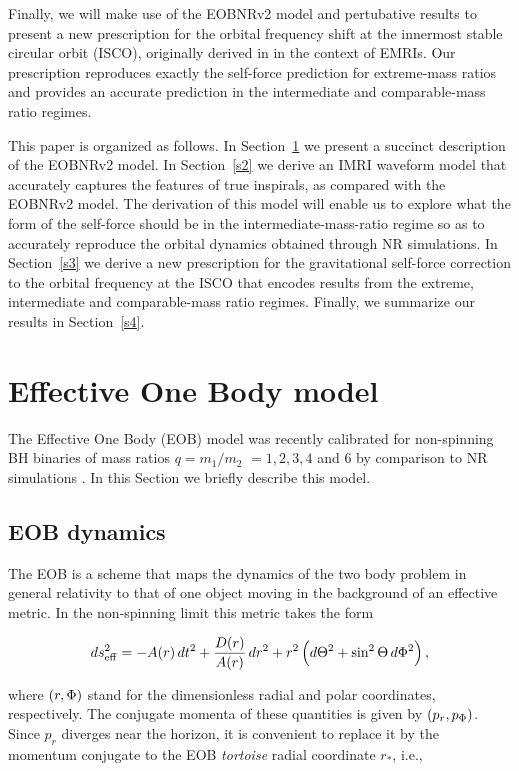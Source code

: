 Finally, we will make use of the EOBNRv2 model and pertubative results to present a new prescription for the orbital frequency shift at the innermost stable circular orbit (ISCO), originally derived in \cite{inner} in the context of EMRIs. Our prescription reproduces exactly the self-force prediction for extreme-mass ratios and provides an accurate prediction in the intermediate and comparable-mass ratio regimes.   

This paper is organized as follows. In Section~\ref{s1} we present a succinct description of the EOBNRv2 model. In Section~\ref{s2} we derive an IMRI waveform model that accurately captures the features of true inspirals, as compared with the EOBNRv2 model. The derivation of this model will enable us to explore what the form of the self-force should be in the intermediate-mass-ratio regime so as to accurately reproduce the orbital dynamics obtained through NR simulations. In Section~\ref{s3} we derive a new prescription for the gravitational self-force correction to the orbital frequency at the ISCO that encodes results from the extreme, intermediate and comparable-mass ratio regimes. Finally, we summarize our results in Section~\ref{s4}.


\section{Effective One Body model}
\label{s1}

The Effective One Body (EOB) model was recently calibrated for non-spinning BH binaries of mass ratios   \(q=m_1/m_2\) \(=1,2,3,4\) and 6 by comparison to NR simulations \cite{BuonannoEOBv2Main}. In this Section we briefly describe this model.

\subsection{EOB dynamics}

The EOB is a scheme that maps the dynamics of the two body problem in general relativity to that of one object moving in the background of an effective metric. In the non-spinning limit this metric takes the form 

\begin{equation}
  ds_\mathrm{eff}^2 = -A(r)\,dt^2 + \frac{D(r)}{A(r)}\,dr^2 +
  r^2\,\Big(d\Theta^2+\sin^2\Theta\,d\OrbitalPhase^2\Big) \,,
  \label{eq:EOBmetric}
\end{equation}

\noindent where  $(r,\Phi)$ stand for the dimensionless radial and polar coordinates, respectively. The conjugate momenta of these quantities is given by $(p_r,p_\Phi)$. Since \(p_r\) diverges near the horizon, it is convenient to replace it  by the momentum conjugate to the EOB \textit{tortoise} radial coordinate $r_*$, i.e., 

